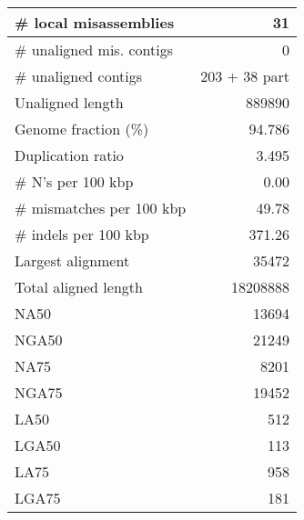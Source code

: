 \documentclass[12pt,a4paper]{article}
\begin{document}
\begin{table}[ht]
\begin{center}
\begin{tabular}{|l*{1}{|r}|}
\# local misassemblies & 31 \\ \hline
\# unaligned mis. contigs & 0 \\ \hline
\# unaligned contigs & 203 + 38 part \\ \hline
Unaligned length & 889890 \\ \hline
Genome fraction (\%) & 94.786 \\ \hline
Duplication ratio & 3.495 \\ \hline
\# N's per 100 kbp & 0.00 \\ \hline
\# mismatches per 100 kbp & 49.78 \\ \hline
\# indels per 100 kbp & 371.26 \\ \hline
Largest alignment & 35472 \\ \hline
Total aligned length & 18208888 \\ \hline
NA50 & 13694 \\ \hline
NGA50 & 21249 \\ \hline
NA75 & 8201 \\ \hline
NGA75 & 19452 \\ \hline
LA50 & 512 \\ \hline
LGA50 & 113 \\ \hline
LA75 & 958 \\ \hline
LGA75 & 181 \\ \hline
\end{tabular}
\end{center}
\end{table}
\end{document}

